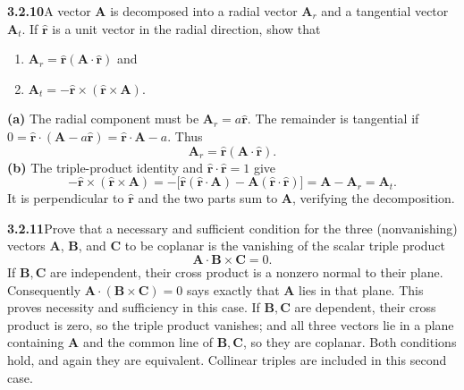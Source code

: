 \par\bigskip
\noindent\textbf{3.2.10}\quad A vector $\mathbf{A}$ is decomposed into a
radial vector $\mathbf{A}_{r}$ and a tangential vector $\mathbf{A}_{t}$. If
$\hat{\mathbf{r}}$ is a unit vector in the radial direction, show that
\begin{enumerate}
\item[(a)] $\mathbf{A}_{r}=\hat{\mathbf{r}}(\mathbf{A}\cdot\hat{\mathbf{r}})$
  and
\item[(b)] $\mathbf{A}_{t}=-\hat{\mathbf{r}}\times(\hat{\mathbf{r}}
  \times\mathbf{A})$.
\end{enumerate}
\solution
\textbf{(a)} The radial component must be $\mathbf A_r=a\hat{\mathbf r}$.
The remainder is tangential if
$0=\hat{\mathbf r}\cdot(\mathbf A-a\hat{\mathbf r})
=\hat{\mathbf r}\cdot\mathbf A-a$. Thus
\[
\boxed{\mathbf A_r=\hat{\mathbf r}(\mathbf A\cdot\hat{\mathbf r})}.
\]
\textbf{(b)} The triple-product identity and
$\hat{\mathbf r}\cdot\hat{\mathbf r}=1$ give
\[
-\hat{\mathbf r}\times(\hat{\mathbf r}\times\mathbf A)
=-\bigl[\hat{\mathbf r}(\hat{\mathbf r}\cdot\mathbf A)
-\mathbf A(\hat{\mathbf r}\cdot\hat{\mathbf r})\bigr]
=\mathbf A-\mathbf A_r=\boxed{\mathbf A_t}.
\]
It is perpendicular to $\hat{\mathbf r}$ and the two parts sum to
$\mathbf A$, verifying the decomposition.

\par\bigskip
\noindent\textbf{3.2.11}\quad Prove that a necessary and sufficient condition
for the three (nonvanishing) vectors $\mathbf{A}$, $\mathbf{B}$, and
$\mathbf{C}$ to be coplanar is the vanishing of the scalar triple product
\[
\mathbf{A}\cdot\mathbf{B}\times\mathbf{C}=0.
\]
\solution
If $\mathbf B,\mathbf C$ are independent, their cross product is a
nonzero normal to their plane. Consequently
$\mathbf A\cdot(\mathbf B\times\mathbf C)=0$ says exactly that
$\mathbf A$ lies in that plane. This proves necessity and sufficiency
in this case.
If $\mathbf B,\mathbf C$ are dependent, their cross product is zero, so
the triple product vanishes; and all three vectors lie in a plane
containing $\mathbf A$ and the common line of $\mathbf B,\mathbf C$, so
they are coplanar. Both conditions hold, and again they are equivalent.
Collinear triples are included in this second case.


